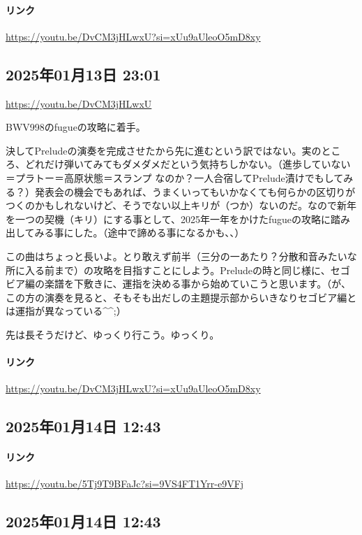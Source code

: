 \paragraph{リンク}
\url{https://youtu.be/DvCM3jHLwxU?si=xUu9aUleoO5mD8xy}

\subsection*{2025年01月13日 23:01}

\url{https://youtu.be/DvCM3jHLwxU}

BWV998のfugueの攻略に着手。

決してPreludeの演奏を完成させたから先に進むという訳ではない。実のところ、どれだけ弾いてみてもダメダメだという気持ちしかない。（進歩していない＝プラトー＝高原状態＝スランプ なのか？一人合宿してPrelude漬けでもしてみる？）発表会の機会でもあれば、うまくいってもいかなくても何らかの区切りがつくのかもしれないけど、そうでない以上キリが（つか）ないのだ。なので新年を一つの契機（キリ）にする事として、2025年一年をかけたfugueの攻略に踏み出してみる事にした。（途中で諦める事になるかも、、）

この曲はちょっと長いよ。とり敢えず前半（三分の一あたり？分散和音みたいな所に入る前まで）の攻略を目指すことにしよう。Preludeの時と同じ様に、セゴビア編の楽譜を下敷きに、運指を決める事から始めていこうと思います。（が、この方の演奏を見ると、そもそも出だしの主題提示部からいきなりセゴビア編とは運指が異なっている\textasciicircum{}\textasciicircum{};）

先は長そうだけど、ゆっくり行こう。ゆっくり。

\paragraph{リンク}
\url{https://youtu.be/DvCM3jHLwxU?si=xUu9aUleoO5mD8xy}

\subsection*{2025年01月14日 12:43}

\paragraph{リンク}
\url{https://youtu.be/5Tj9T9BFaJc?si=9VS4FT1Yrr-e9VFj}

\subsection*{2025年01月14日 12:43}

